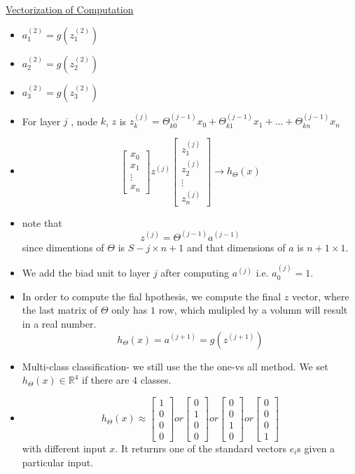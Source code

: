 \documentclass[12pt]{article}
\begin{document}
\underline{Vectorization of Computation}

\begin{itemize}
	\item $a_1^{(2)} = g(z_1^{(2)})$
	\item $a_2^{(2)} = g(z_2^{(2)})$
	\item $a_3^{(2)} = g(z_3^{(2)})$
	\item For layer $j$ , node $k$, $z$ is $z_k^{(j)} = \Theta_{k0}^{(j-1)}x_0 + \Theta_{k1}^{(j-1)}x_1+\ldots + \Theta_{kn}^{(j-1)}x_n$
	\item 
	$$  \begin{bmatrix}
	x_0 \\
	x_1 \\
	\vdots\\
	x_n \end{bmatrix}
	z^{(j)}
	\left[
	\begin{array}{ccc} 
	z_1^{(j)}\\
	z_2^{(j)} \\
	\vdots\\
	z_n^{(j)} 
	\end{array}
	\right]
	\to h_\Theta(x)
	$$
	\item note that \[z^{(j)} = \Theta^{(j-1)}a^{(j-1)}\] since dimentions of $\Theta$ is $S-j\times n+1$ and that dimensions of $a$ is $n+1\times 1$.
	\item We add the biad unit to layer $j$ after computing $a^{(j)}$ i.e. $a_0^{(j)} = 1$.
	\item In order to compute the fial hpothesis, we compute the final $z$ vector, where the last matrix of $\Theta$ only has $1$ row, which mulipled by a volumn will result in a real number. \[h_\Theta(x) = a^{(j+1)}=g(z^{(j+1)})\]
	\item Multi-class classification- we still use the the one-vs all method. We set $h_\Theta(x)\in\mathbb{R}^4$ if there are $4$ classes. \\
	\item \[h_\Theta(x) \approx \left[\begin{array}{ccc} 
	1\\
	0\\
	0\\
	0
	\end{array}  \right]
	or 
	\left[\begin{array}{ccc} 
		0\\
		1\\
		0\\
		0
	\end{array}  \right]
   or \left[ \begin{array}{ccc} 
   	0\\
   	0\\
   	1\\
   	0
   \end{array}  \right]
or \left[ \begin{array}{ccc} 
	0\\
	0\\
	0\\
	1
	\end{array} \right] \]  with different input $x$. It returnrs one of the standard vectors $e_i$s given a particular input.
\end{itemize}
\newpage
\end{document}
